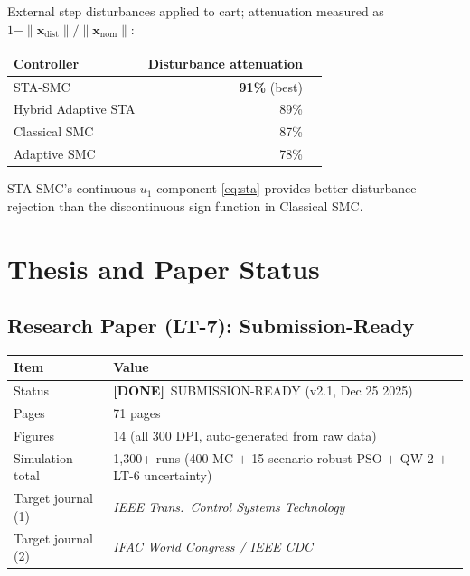 \documentclass[11pt, a4paper]{article}
\newcommand{\okmark}{\textbf{\textcolor{done}{[DONE]}}}
\newcommand{\vx}{\boldsymbol{x}}
\begin{document}
External step disturbances applied to cart; attenuation measured
as $1 - \|\vx_\text{dist}\|/\|\vx_\text{nom}\|$:

\begin{center}
\begin{tabular}{@{}p{3.5cm}rl@{}}
\toprule
\textbf{Controller} & \textbf{Disturbance attenuation} & \\
\midrule
STA-SMC               & \textbf{91\%} (best)  & \\
Hybrid Adaptive STA   & 89\%                  & \\
Classical SMC         & 87\%                  & \\
Adaptive SMC          & 78\%                  & \\
\bottomrule
\end{tabular}
\end{center}

STA-SMC's continuous $u_1$ component \eqref{eq:sta} provides better
disturbance rejection than the discontinuous sign function in
Classical SMC.

\section{Thesis and Paper Status}

\subsection{Research Paper (LT-7): Submission-Ready}

\begin{center}
\begin{tabular}{@{}p{4cm}p{9cm}@{}}
\toprule
\textbf{Item}         & \textbf{Value} \\
\midrule
Status                & \okmark\ SUBMISSION-READY (v2.1, Dec 25 2025) \\
Pages                 & 71 pages \\
Figures               & 14 (all 300 DPI, auto-generated from raw data) \\
Simulation total      & 1,300+ runs (400 MC $+$ 15-scenario robust PSO
                        $+$ QW-2 $+$ LT-6 uncertainty) \\
Target journal (1)    & \textit{IEEE Trans.\ Control Systems Technology} \\
Target journal (2)    & \textit{IFAC World Congress / IEEE CDC} \\
\bottomrule
\end{tabular}
\end{center}
\end{document}
